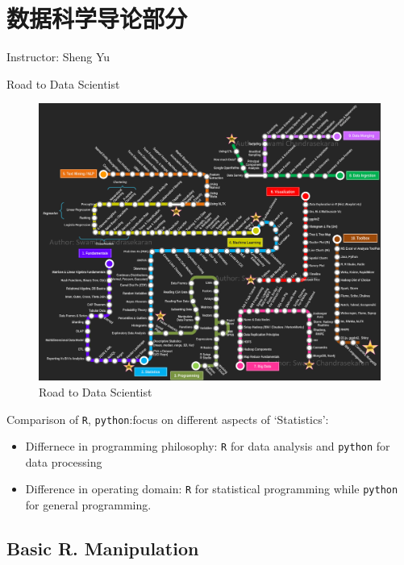 \section{数据科学导论部分}\label{SecDataScience}
\begin{center}
    Instructor: Sheng Yu
\end{center}

\begin{point}
    Road to Data Scientist
\end{point}

\begin{figure}[H]
    \centering
    \includegraphics[width=\linewidth]{pic/RoadToDataScientist1.png}
    \caption{Road to Data Scientist}
    \label{RoadToDataScience}
\end{figure}


Comparison of \lstinline|R|, \lstinline|python|:focus on different aspects of `Statistics':
\begin{itemize}[topsep=2pt,itemsep=0pt]
    \item Differnece in programming philosophy: \lstinline|R| for data analysis and \lstinline|python| for data processing
    \item Difference in operating domain: \lstinline|R| for statistical programming while \lstinline|python| for general programming.
\end{itemize}



\subsection{Basic R. Manipulation}


